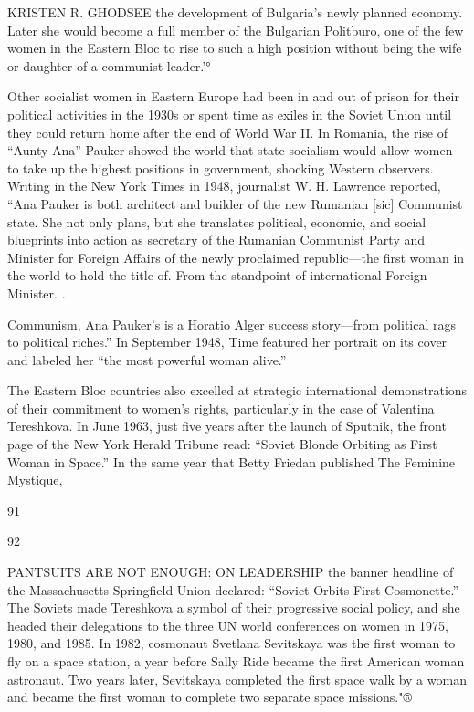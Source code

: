  \par 
KRISTEN R. GHODSEE the development of Bulgaria’s newly planned economy. Later she would become a full member of the Bulgarian Politburo, one of the few women in the Eastern Bloc to rise to such a high position without being the wife or daughter of a communist leader.'°
 \par 

 \par 
Other socialist women in Eastern Europe had been in and out of prison for their political activities in the 1930s or spent time as exiles in the Soviet Union until they could return home after the end of World War II. In Romania, the rise of “Aunty Ana” Pauker showed the world that state socialism would allow women to take up the highest positions in government, shocking Western observers. Writing in the New York Times in 1948, journalist W. H. Lawrence reported, “Ana Pauker is both architect and builder of the new Rumanian [sic] Communist state. She not only plans, but she translates political, economic, and social blueprints into action as secretary of the Rumanian Communist Party and Minister for Foreign Affairs of the newly proclaimed republic—the first woman in the world to hold the title of. From the standpoint of international Foreign Minister. .
 \par 
Communism, Ana Pauker’s is a Horatio Alger success story—from political rags to political riches.” In September 1948, Time featured her portrait on its cover and labeled her “the most powerful woman alive.”
 \par 
The Eastern Bloc countries also excelled at strategic international demonstrations of their commitment to women’s rights, particularly in the case of Valentina Tereshkova. In June 1963, just five years after the launch of Sputnik, the front page of the New York Herald Tribune read: “Soviet Blonde Orbiting as First Woman in Space.” In the same year that Betty Friedan published The Feminine Mystique,
 \par 
91
 \par 
92
 \par 
PANTSUITS ARE NOT ENOUGH: ON LEADERSHIP the banner headline of the Massachusetts Springfield Union declared: “Soviet Orbits First Cosmonette.” The Soviets made Tereshkova a symbol of their progressive social policy, and she headed their delegations to the three UN world conferences on women in 1975, 1980, and 1985. In 1982, cosmonaut Svetlana Sevitskaya was the first woman to fly on a space station, a year before Sally Ride became the first American woman astronaut. Two years later, Sevitskaya completed the first space walk by a woman and became the first woman to complete two separate space missions."®
